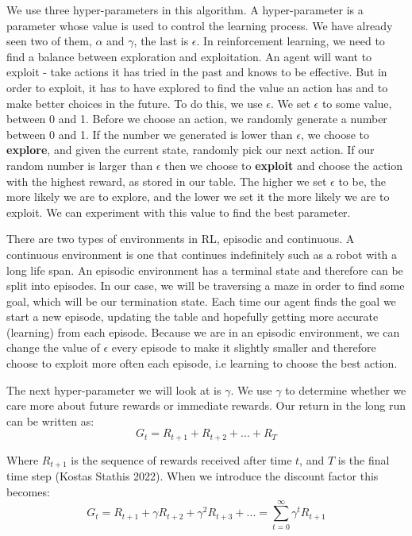 \documentclass[]{final_report}
\begin{document}
We use three hyper-parameters in this algorithm. A hyper-parameter is a parameter whose value is used to control the learning process. We have already seen two of them, $\alpha$ and $\gamma$, the last is $\epsilon$. In reinforcement learning, we need to find a balance between exploration and exploitation. An agent will want to exploit - take actions it has tried in the past and knows to be effective. But in order to exploit, it has to have explored to find the value an action has and to make better choices in the future. To do this, we use $\epsilon$. We set $\epsilon$ to some value, between 0 and 1. Before we choose an action, we randomly generate a number between 0 and 1. If the number we generated is lower than $\epsilon$, we choose to \textbf{explore}, and given the current state, randomly pick our next action. If our random number is larger than $\epsilon$ then we choose to \textbf{exploit} and choose the action with the highest reward, as stored in our table. The higher we set $\epsilon$ to be, the more likely we are to explore, and the lower we set it the more likely we are to exploit. We can experiment with this value to find the best parameter. 

There are two types of environments in RL, episodic and continuous. A continuous environment is one that continues indefinitely such as a robot with a long life span. An episodic environment has a terminal state and therefore can be split into episodes. In our case, we will be traversing a maze in order to find some goal, which will be our termination state. Each time our agent finds the goal we start a new episode, updating the table and hopefully getting more accurate (learning) from each episode. Because we are in an episodic environment, we can change the value of $\epsilon$ every episode to make it slightly smaller and therefore choose to exploit more often each episode, i.e learning to choose the best action. 

The next hyper-parameter we will look at is $\gamma$. We use $\gamma$ to determine whether we care more about future rewards or immediate rewards. Our return in the long run can be written as:
\begin{equation}
    G_t = R_{t+1} + R_{t+2} + ... + R_T
\end{equation}

Where $R_{t+1}$ is the sequence of rewards received after time $t$, and $T$ is the final time step (Kostas Stathis 2022). When we introduce the discount factor this becomes: 
\begin{equation}
    G_t = R_{t+1} + \gamma R_{t+2} + \gamma^2 R_{t+3} + ... = \sum_{t=0}^{\infty} \gamma^t R_{t+1}
\end{equation}
\end{document}
